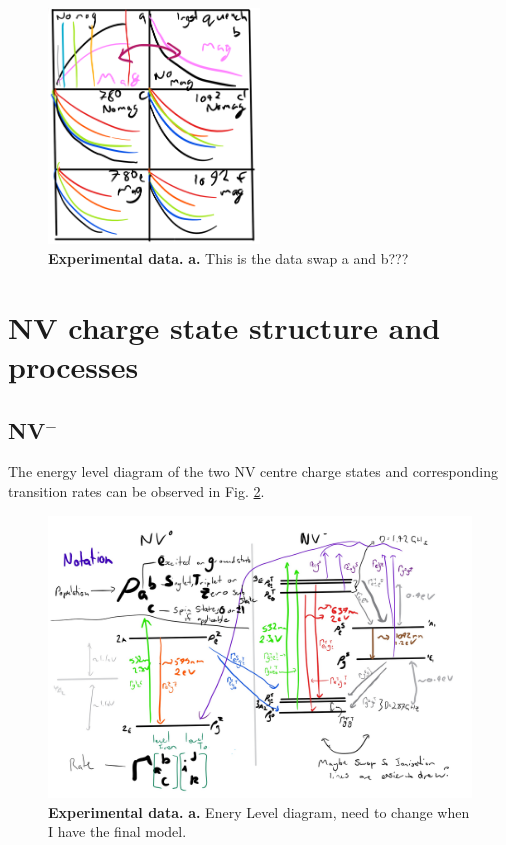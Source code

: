 \documentclass[preprint,prl]{revtex4}
\begin{document}
\begin{figure}[t]
  \centering
  \includegraphics[width=0.5\textwidth]{Data.png} 
 \caption{\textbf{Experimental data.} \textbf{a.} This is the data swap a and b???} \label{FigData}
\end{figure}


\section{NV charge state structure and processes}
\subsection{NV$^-$}
The energy level diagram of the two NV centre charge states and corresponding transition rates can be observed in Fig. \ref{FigEnergyLevels}.

\begin{figure}[t]
  \centering
  \includegraphics[width=1\textwidth]{NVjpg.jpg} 
 \caption{\textbf{Experimental data.} \textbf{a.} Enery Level diagram, need to change when I have the final model.} \label{FigEnergyLevels}
\end{figure}
\end{document}

